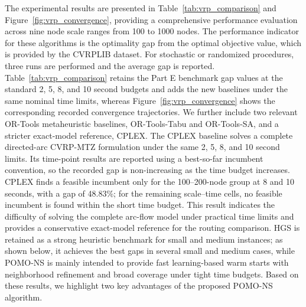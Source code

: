 \documentclass[preprint,12pt,authoryear]{elsarticle}
\theoremstyle{definition}
\begin{document}
The experimental results are presented in Table~\ref{tab:vrp_comparison} and Figure~\ref{fig:vrp_convergence}, providing a comprehensive performance evaluation across nine node scale ranges from 100 to 1000 nodes. The performance indicator for these algorithms is the optimality gap from the optimal objective value, which is provided by the CVRPLIB dataset. For stochastic or randomized procedures, three runs are performed and the average gap is reported. Table~\ref{tab:vrp_comparison} retains the Part E benchmark gap values at the standard 2, 5, 8, and 10 second budgets and adds the new baselines under the same nominal time limits, whereas Figure~\ref{fig:vrp_convergence} shows the corresponding recorded convergence trajectories. We further include two relevant OR-Tools metaheuristic baselines, OR-Tools-Tabu and OR-Tools-SA, and a stricter exact-model reference, CPLEX. The CPLEX baseline solves a complete directed-arc CVRP-MTZ formulation under the same 2, 5, 8, and 10 second limits. Its time-point results are reported using a best-so-far incumbent convention, so the recorded gap is non-increasing as the time budget increases. CPLEX finds a feasible incumbent only for the 100--200-node group at 8 and 10 seconds, with a gap of 48.83\%; for the remaining scale--time cells, no feasible incumbent is found within the short time budget. This result indicates the difficulty of solving the complete arc-flow model under practical time limits and provides a conservative exact-model reference for the routing comparison. HGS is retained as a strong heuristic benchmark for small and medium instances; as shown below, it achieves the best gaps in several small and medium cases, while POMO-NS is mainly intended to provide fast learning-based warm starts with neighborhood refinement and broad coverage under tight time budgets. Based on these results, we highlight two key advantages of the proposed POMO-NS algorithm.
\end{document}
